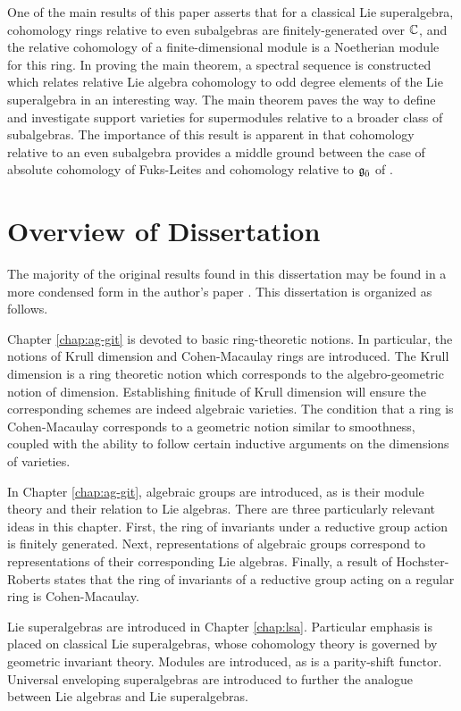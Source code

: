 One of the main results of this paper asserts that for a classical Lie superalgebra, cohomology rings relative to even subalgebras are finitely-generated over $\mathbb{C}$, and the relative cohomology of a finite-dimensional module is a Noetherian module for this ring. In proving the main theorem, a spectral sequence is constructed  which relates relative Lie algebra cohomology to odd degree elements of the Lie superalgebra in an interesting way. The main theorem paves the way to define and investigate support varieties for supermodules relative to a broader class of subalgebras. The importance of this result is apparent in that cohomology relative to an even subalgebra provides a middle ground between the case of absolute cohomology of Fuks-Leites and cohomology relative to ${\mathfrak{g}}_{\bar{0}}$ of \cite{BKN-1}.

\section{Overview of Dissertation}
\label{sec:overview}

The majority of the original results found in this dissertation may be found in a more condensed form in the author's paper \cite{1711.02112}. This dissertation is organized as follows.

Chapter \ref{chap:ag-git} is devoted to basic ring-theoretic notions. In particular, the notions of Krull dimension and Cohen-Macaulay rings are introduced. The Krull dimension is a ring theoretic notion which corresponds to the algebro-geometric notion of dimension. Establishing finitude of Krull dimension will ensure the corresponding schemes are indeed algebraic varieties. The condition that a ring is Cohen-Macaulay corresponds to a geometric notion similar to smoothness, coupled with the ability to follow certain inductive arguments on the dimensions of varieties.

In Chapter \ref{chap:ag-git}, algebraic groups are introduced, as is their module theory and their relation to Lie algebras. There are three particularly relevant ideas in this chapter. First, the ring of invariants under a reductive group action is finitely generated. Next, representations of algebraic groups correspond to representations of their corresponding Lie algebras. Finally, a result of Hochster-Roberts \cite{MR0347810} states that the ring of invariants of a reductive group acting on a regular ring is Cohen-Macaulay.

Lie superalgebras are introduced in Chapter \ref{chap:lsa}. Particular emphasis is placed on classical Lie superalgebras, whose cohomology theory is governed by geometric invariant theory. Modules are introduced, as is a parity-shift functor. Universal enveloping superalgebras are introduced to further the analogue between Lie algebras and Lie superalgebras.

